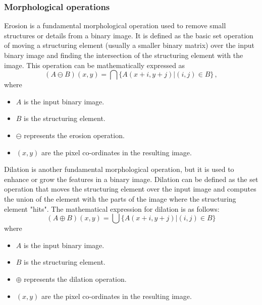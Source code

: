 \subsubsection{Morphological operations}
\label{subsubsec:morphological_operations}
Erosion is a fundamental morphological operation used to remove small structures or details from a binary image. It is defined as the basic set operation of moving a structuring element (usually a smaller binary matrix) over the input binary image and finding the intersection of the structuring element with the image. This operation can be mathematically expressed as
\begin{equation}
  (A \ominus B)(x, y) = \bigcap \{A(x + i, y + j) | (i, j) \in B\}\,,
  \label{eq:erosion}
\end{equation}
where
\begin{itemize}
  \item $A$ is the input binary image.
  \item $B$ is the structuring element.
  \item $\ominus$ represents the erosion operation.
  \item $(x, y)$ are the pixel co-ordinates in the resulting image.
\end{itemize}

Dilation is another fundamental morphological operation, but it is used to enhance or grow the features in a binary image. Dilation can be defined as the set operation that moves the structuring element over the input image and computes the union of the element with the parts of the image where the structuring element "hits". The mathematical expression for dilation is as follows:
\begin{equation}
  (A \oplus B)(x, y) = \bigcup \{A(x + i, y + j) | (i, j) \in B\}
  \label{eq:dilation}
\end{equation}
where
\begin{itemize}
  \item $A$ is the input binary image.
  \item $B$ is the structuring element.
  \item $\oplus$ represents the dilation operation.
  \item $(x, y)$ are the pixel co-ordinates in the resulting image.
\end{itemize}

